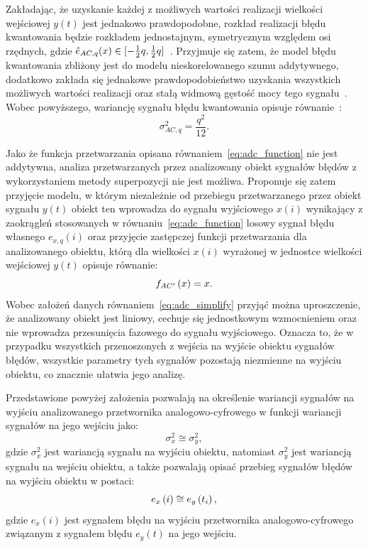 Zakładając, że uzyskanie każdej z możliwych wartości realizacji wielkości wejściowej $y(t)$ jest jednakowo prawdopodobne, rozkład realizacji błędu kwantowania będzie rozkładem jednostajnym, symetrycznym względem osi rzędnych, gdzie $\hat{e}_{AC,q}(x) \in \interval{-\frac{1}{2} q}{\frac{1}{2} q}$~\cite{jakubiec_przetwarzanie, jakubiec_system, sienkowski_kwant}. Przyjmuje się zatem, że model błędu kwantowania zbliżony jest do modelu nieskorelowanego szumu addytywnego, dodatkowo zakłada się jednakowe prawdopodobieństwo uzyskania wszystkich możliwych wartości realizacji oraz stałą widmową gęstość mocy tego sygnału~\cite{gray_quantization, widrow_quantization}. Wobec powyższego, wariancję sygnału błędu kwantowania opisuje równanie~\cite{jcgm_guide}:
\begin{equation}
\sigma_{AC,q}^{2} = \frac{q^{2}}{12} \label{eq:adc_errvar}.
\end{equation}

Jako że funkcja przetwarzania opisana równaniem~\eqref{eq:adc_function} nie jest addytywna, analiza przetwarzanych przez analizowany obiekt sygnałów błędów z wykorzystaniem metody superpozycji nie jest możliwa. Proponuje się zatem przyjęcie modelu, w którym niezależnie od przebiegu przetwarzanego przez obiekt sygnału $y(t)$ obiekt ten wprowadza do sygnału wyjściowego $x(i)$ wynikający z zaokrągleń stosowanych w równaniu~\eqref{eq:adc_function} losowy sygnał błędu własnego $e_{x,q}(i)$ oraz przyjęcie zastępczej funkcji przetwarzania dla analizowanego obiektu, którą dla wielkości $x(i)$ wyrażonej w jednostce wielkości wejściowej $y(t)$ opisuje równanie:
\begin{equation}
f_{AC'} \left(x\right) = x \label{eq:adc_simplify}.
\end{equation}
Wobec założeń danych równaniem~\eqref{eq:adc_simplify} przyjąć można uproszczenie, że analizowany obiekt jest liniowy, cechuje się jednostkowym wzmocnieniem oraz nie wprowadza przesunięcia fazowego do sygnału wyjściowego. Oznacza to, że w przypadku wszystkich przenoszonych z wejścia na wyjście obiektu sygnałów błędów, wszystkie parametry tych sygnałów pozostają niezmienne na wyjściu obiektu, co znacznie ułatwia jego analizę.

Przedstawione powyżej założenia pozwalają na określenie wariancji sygnałów na wyjściu analizowanego przetwornika analogowo-cyfrowego w funkcji wariancji sygnałów na jego wejściu jako:
\begin{equation}
\sigma_{x}^{2} \cong \sigma_{y}^{2} \label{eq:adc_varout},
\end{equation}
gdzie $\sigma_{x}^{2}$ jest wariancją sygnału na wyjściu obiektu, natomiast $\sigma_{y}^{2}$ jest wariancją sygnału na wejściu obiektu, a także pozwalają opisać przebieg sygnałów błędów na wyjściu obiektu w postaci:
\begin{equation}
e_{x} \left(i\right) \cong e_{y} \left(t_{i}\right) \label{eq:adc_errout},
\end{equation}
gdzie $e_{x}(i)$ jest sygnałem błędu na wyjściu przetwornika analogowo-cyfrowego związanym z sygnałem błędu $e_{y}(t)$ na jego wejściu.

